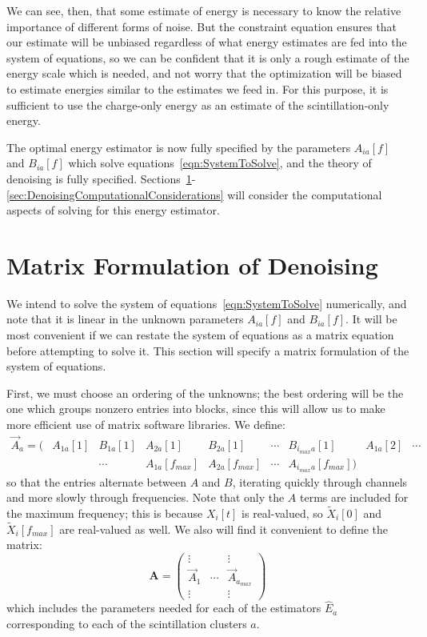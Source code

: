 We can see, then, that some estimate of energy is necessary to know the relative importance of different forms of noise.  But the constraint equation ensures that our estimate will be unbiased regardless of what energy estimates are fed into the system of equations, so we can be confident that it is only a rough estimate of the energy scale which is needed, and not worry that the optimization will be biased to estimate energies similar to the estimates we feed in.  For this purpose, it is sufficient to use the charge-only energy as an estimate of the scintillation-only energy.

The optimal energy estimator is now fully specified by the parameters $A_{ia}[f]$ and $B_{ia}[f]$ which solve equations~\ref{eqn:SystemToSolve}, and the theory of denoising is fully specified.  Sections~\ref{sec:MatrixFormulationOfDenoising}-\ref{sec:DenoisingComputationalConsiderations} will consider the computational aspects of solving for this energy estimator.

\section{Matrix Formulation of Denoising}\label{sec:MatrixFormulationOfDenoising}

We intend to solve the system of equations~\ref{eqn:SystemToSolve} numerically, and note that it is linear in the unknown parameters $A_{ia}[f]$ and $B_{ia}[f]$.  It will be most convenient if we can restate the system of equations as a matrix equation before attempting to solve it.  This section will specify a matrix formulation of the system of equations.

First, we must choose an ordering of the unknowns; the best ordering will be the one which groups nonzero entries into blocks, since this will allow us to make more efficient use of matrix software libraries.  We define:
\begin{equation} \begin{matrix}
\vec{A}_a = \bigg( & A_{1 a}[1] & B_{1 a}[1] & A_{2 a}[1] & B_{2 a}[1] & \cdots & B_{i_{max} a}[1] & A_{1 a}[2] & \cdots \\
& & \cdots  & A_{1 a}[f_{max}] & A_{2 a}[f_{max}] & \cdots & A_{i_{max} a}[f_{max}] \bigg)
\end{matrix}\end{equation}
so that the entries alternate between $A$ and $B$, iterating quickly through channels and more slowly through frequencies.  Note that only the $A$ terms are included for the maximum frequency; this is because $X_i[t]$ is real-valued, so $\widetilde{X}_i[0]$ and $\widetilde{X}_i[f_{max}]$ are real-valued as well.  We also will find it convenient to define the matrix:
\begin{equation}
\mathbf{A} = \begin{pmatrix}
\vdots & & \vdots \\
\vec{A}_1 & \cdots & \vec{A}_{a_{max}} \\
\vdots & & \vdots
\end{pmatrix}
\end{equation}
which includes the parameters needed for each of the estimators $\widehat{E}_a$ corresponding to each of the scintillation clusters $a$.

